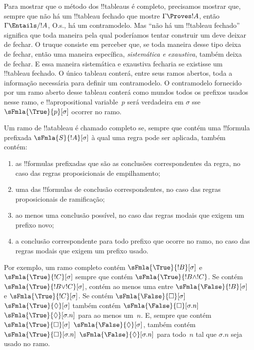 \documentclass[../../../include/open-logic-section]{subfiles}
\begin{document}


\begin{explain}
  Para mostrar que o método dos !!{tableau}s é completo, precisamos
  mostrar que, sempre que não há um !!{tableau} fechado que mostre
  $\Gamma \Proves !A$, então $\Gamma \Entails/ !A$, O.s.\@, há um
  contramodelo. Mas ``não há um !!{tableau} fechado'' significa que toda
  maneira pela qual poderíamos tentar construir um deve deixar de fechar.
  O truque consiste em perceber que, se toda maneira desse tipo deixa de
  fechar, então uma maneira específica, \emph{sistemática e exaustiva},
  também deixa de fechar. E essa maneira sistemática e exaustiva fecharia
  se existisse um !!{tableau} fechado. O único tableau conterá, entre seus
  ramos abertos, toda a informação necessária para definir um contramodelo.
  O contramodelo fornecido por um ramo aberto desse tableau conterá como
  mundos todos os prefixos usados nesse ramo, e !!a{propositional
    variable}~$p$ será verdadeira em $\sigma$ sse
  $\sFmla{\True}{p}[\sigma]$ ocorrer no ramo.
\end{explain}

\begin{defn}
  Um ramo de !!a{tableau} é chamado completo se, sempre que contém uma
  !!{formula} prefixada $\sFmla{S}{!A}[\sigma]$ à qual uma regra pode
  ser aplicada, também contém:
  \begin{enumerate}
    \item as !!{formula}s prefixadas que são as conclusões correspondentes
      da regra, no caso das regras proposicionais de empilhamento;
    \item uma das !!{formula}s de conclusão correspondentes, no caso das
      regras proposicionais de ramificação;
    \item ao menos uma conclusão possível, no caso das regras modais que
      exigem um prefixo novo;
    \item a conclusão correspondente para todo prefixo que ocorre no ramo,
      no caso das regras modais que exigem um prefixo usado.
  \end{enumerate}
\end{defn}

\begin{explain}
Por exemplo, um ramo completo contém $\sFmla{\True}{!B}[\sigma]$ e
$\sFmla{\True}{!C}[\sigma]$ sempre que contém $\sFmla{\True}{!B
  \land !C}$. Se contém $\sFmla{\True}{!B \lor !C}[\sigma]$, contém
ao menos uma entre $\sFmla{\False}{!B}[\sigma]$ e
$\sFmla{\True}{!C}[\sigma]$. Se contém 
{$\sFmla{\False}{\Box}[\sigma]$} {$\sFmla{\True}{\Diamond}[\sigma]$}
também contém  {$\sFmla{\False}{\Box}[\sigma.n]$}
{$\sFmla{\True}{\Diamond}[\sigma.n]$} para ao menos um~$n$. E, sempre
que contém  {$\sFmla{\True}{\Box}[\sigma]$}
{$\sFmla{\False}{\Diamond}[\sigma]$}, também contém 
{$\sFmla{\True}{\Box}[\sigma.n]$}
{$\sFmla{\False}{\Diamond}[\sigma.n]$} para todo~$n$ tal que
$\sigma.n$ seja usado no ramo.
\end{explain}
\end{document}
